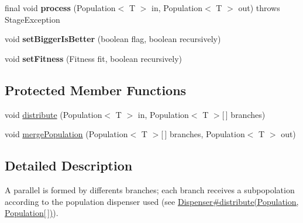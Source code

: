 \begin{CompactItemize}
\item 
\hypertarget{classjenes_1_1stage_1_1_parallel_3_01_t_01extends_01_chromosome_01_4_504ed9a0dddbfd46a9bebd4a38dba964}{
final void \textbf{process} (Population$<$ T $>$ in, Population$<$ T $>$ out)  throws StageException }
\label{classjenes_1_1stage_1_1_parallel_3_01_t_01extends_01_chromosome_01_4_504ed9a0dddbfd46a9bebd4a38dba964}

\item 
\hypertarget{classjenes_1_1stage_1_1_parallel_3_01_t_01extends_01_chromosome_01_4_e8ea18096e341f41bf44c56ba1628a99}{
void \textbf{setBiggerIsBetter} (boolean flag, boolean recursively)}
\label{classjenes_1_1stage_1_1_parallel_3_01_t_01extends_01_chromosome_01_4_e8ea18096e341f41bf44c56ba1628a99}

\item 
\hypertarget{classjenes_1_1stage_1_1_parallel_3_01_t_01extends_01_chromosome_01_4_e50a3b3fae5a0b2c3465a0bae243263b}{
void \textbf{setFitness} (Fitness fit, boolean recursively)}
\label{classjenes_1_1stage_1_1_parallel_3_01_t_01extends_01_chromosome_01_4_e50a3b3fae5a0b2c3465a0bae243263b}

\end{CompactItemize}
\subsection*{Protected Member Functions}
\begin{CompactItemize}
\item 
void \hyperlink{classjenes_1_1stage_1_1_parallel_3_01_t_01extends_01_chromosome_01_4_afb82610de353045546319738543fab9}{distribute} (Population$<$ T $>$ in, Population$<$ T $>$\mbox{[}$\,$\mbox{]} branches)
\item 
void \hyperlink{classjenes_1_1stage_1_1_parallel_3_01_t_01extends_01_chromosome_01_4_9cd26799d837f1e1f5ddfcabd0d18aaa}{mergePopulation} (Population$<$ T $>$\mbox{[}$\,$\mbox{]} branches, Population$<$ T $>$ out)
\end{CompactItemize}


\subsection{Detailed Description}
A parallel is formed by differents branches; each branch receives a subpopolation according to the population dispenser used (see \hyperlink{}{Dispenser\#distribute(Population, Population\mbox{[}$\,$\mbox{]})}).\par
 

